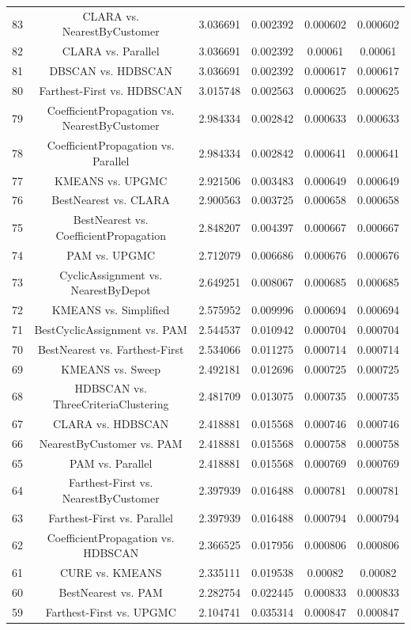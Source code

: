 \documentclass[a4paper,10pt]{article}
\begin{document}
\begin{landscape}
\begin{table}[!htp]
\begin{tabular}{cccccc}
83&CLARA vs. NearestByCustomer&3.036691&0.002392&0.000602&0.000602\\
82&CLARA vs. Parallel&3.036691&0.002392&0.00061&0.00061\\
81&DBSCAN vs. HDBSCAN&3.036691&0.002392&0.000617&0.000617\\
80&Farthest-First vs. HDBSCAN&3.015748&0.002563&0.000625&0.000625\\
79&CoefficientPropagation vs. NearestByCustomer&2.984334&0.002842&0.000633&0.000633\\
78&CoefficientPropagation vs. Parallel&2.984334&0.002842&0.000641&0.000641\\
77&KMEANS vs. UPGMC&2.921506&0.003483&0.000649&0.000649\\
76&BestNearest vs. CLARA&2.900563&0.003725&0.000658&0.000658\\
75&BestNearest vs. CoefficientPropagation&2.848207&0.004397&0.000667&0.000667\\
74&PAM vs. UPGMC&2.712079&0.006686&0.000676&0.000676\\
73&CyclicAssignment vs. NearestByDepot&2.649251&0.008067&0.000685&0.000685\\
72&KMEANS vs. Simplified&2.575952&0.009996&0.000694&0.000694\\
71&BestCyclicAssignment vs. PAM&2.544537&0.010942&0.000704&0.000704\\
70&BestNearest vs. Farthest-First&2.534066&0.011275&0.000714&0.000714\\
69&KMEANS vs. Sweep&2.492181&0.012696&0.000725&0.000725\\
68&HDBSCAN vs. ThreeCriteriaClustering&2.481709&0.013075&0.000735&0.000735\\
67&CLARA vs. HDBSCAN&2.418881&0.015568&0.000746&0.000746\\
66&NearestByCustomer vs. PAM&2.418881&0.015568&0.000758&0.000758\\
65&PAM vs. Parallel&2.418881&0.015568&0.000769&0.000769\\
64&Farthest-First vs. NearestByCustomer&2.397939&0.016488&0.000781&0.000781\\
63&Farthest-First vs. Parallel&2.397939&0.016488&0.000794&0.000794\\
62&CoefficientPropagation vs. HDBSCAN&2.366525&0.017956&0.000806&0.000806\\
61&CURE vs. KMEANS&2.335111&0.019538&0.00082&0.00082\\
60&BestNearest vs. PAM&2.282754&0.022445&0.000833&0.000833\\
59&Farthest-First vs. UPGMC&2.104741&0.035314&0.000847&0.000847\\

\end{tabular}
\end{table}
\end{landscape}
\end{document}
